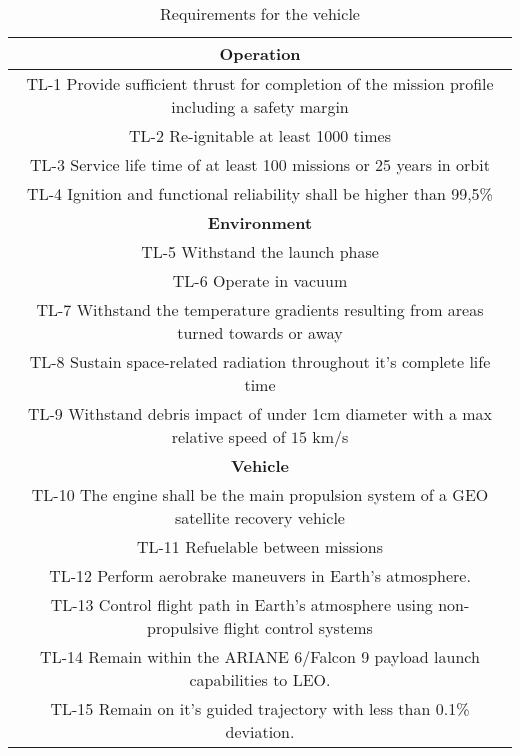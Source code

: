 \begin{table}
\begin{tabular}{|c|}
	\hline
	\cellcolor{blue!60}\textbf{Operation}\\
	\hline
	\cellcolor{blue!15} TL-1 Provide sufficient thrust for completion of the mission profile including a safety margin\\
	\hline
	\cellcolor{blue!15} TL-2 Re-ignitable at least 1000 times\\
	\hline
	\cellcolor{blue!15} TL-3 Service life time of at least 100 missions or 25 years in orbit\\
	\hline
	\cellcolor{blue!15} TL-4 Ignition and functional reliability shall be higher than 99,5\%\\

	\hline
	\cellcolor{blue!60}\textbf{Environment}\\
	\hline
	\cellcolor{blue!15} TL-5 Withstand the launch phase
	\\
	\hline
	\cellcolor{blue!15} TL-6 Operate in vacuum
	\\
	\hline
	\cellcolor{blue!15} TL-7 Withstand the temperature gradients resulting from areas turned towards or away
	\\
	\hline
	\cellcolor{blue!15} TL-8 Sustain space-related radiation throughout it's complete life time
	
	\\
	\hline
	\cellcolor{blue!15} TL-9 Withstand debris impact of under 1cm diameter with a max relative speed of $15$ km/s 	
	\\
	\hline
	\cellcolor{blue!60}\textbf{Vehicle}\\
	\hline
	\cellcolor{blue!15} TL-10 The engine shall be the main propulsion system of a GEO satellite recovery vehicle
	\\
	\hline
	\cellcolor{blue!15} TL-11 Refuelable between missions
	\\
	\hline
	\cellcolor{blue!15} TL-12 Perform aerobrake maneuvers in Earth's atmosphere.
	\\
	\hline
	\cellcolor{blue!15} TL-13 Control \space flight path in  Earth's atmosphere  using non-propulsive flight control systems
	\\
	\cellcolor{blue!15} TL-14 Remain within the ARIANE 6/Falcon 9 payload launch capabilities to LEO.
	
	\\
	\cellcolor{blue!15} TL-15 Remain on it's guided trajectory with less than 0.1\% deviation.
	
	\\
	\hline
\end{tabular}
\caption{Requirements for the vehicle}
\end{table}